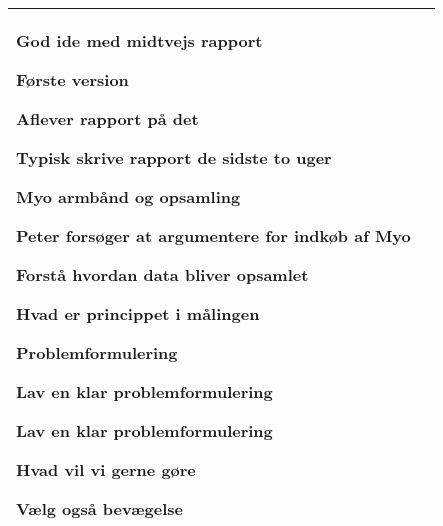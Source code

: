 \begin{center}
\begin{tabular}{| l | p{10cm} |}
\begin{myEnumerate}
\begin{myItemize}
\begin{myItemize}
				\end{myItemize}
				\item God ide med midtvejs rapport
				\begin{myItemize}
					\item Første version
					\item Aflever rapport på det
				\end{myItemize}
				\item Typisk skrive rapport de sidste to uger
			\end{myItemize}
			\item Myo armbånd og opsamling 
			\begin{myItemize}
				\item Peter forsøger at argumentere for indkøb af Myo
				\item Forstå hvordan data bliver opsamlet
				\item Hvad er princippet i målingen
			\end{myItemize}
			\item Problemformulering
			\begin{myItemize}
				\item Lav en klar problemformulering
				\begin{myItemize}
					\item Lav en klar problemformulering
					\item Hvad vil vi gerne gøre
					\item Vælg også bevægelse
				\end{myItemize}
			\end{myItemize}
			\end{myEnumerate}\\  	
		\hline
	\end{tabular}
\end{center}


